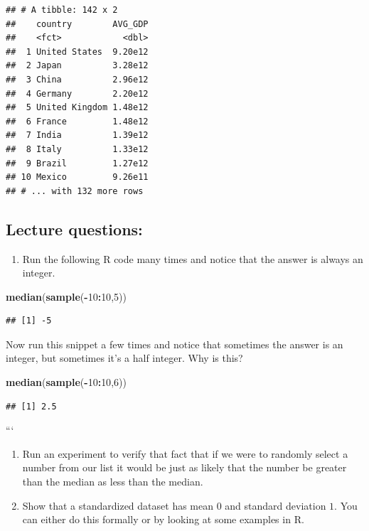 \documentclass[]{book}
\newenvironment{Shaded}{\begin{snugshade}}{\end{snugshade}}
\newcommand{\DecValTok}[1]{\textcolor[rgb]{0.00,0.00,0.81}{#1}}
\newcommand{\KeywordTok}[1]{\textcolor[rgb]{0.13,0.29,0.53}{\textbf{#1}}}
\newcommand{\NormalTok}[1]{#1}
\newcommand{\OperatorTok}[1]{\textcolor[rgb]{0.81,0.36,0.00}{\textbf{#1}}}
\providecommand{\tightlist}{%
  \setlength{\itemsep}{0pt}\setlength{\parskip}{0pt}}
\begin{document}
\begin{verbatim}
## # A tibble: 142 x 2
##    country        AVG_GDP
##    <fct>            <dbl>
##  1 United States  9.20e12
##  2 Japan          3.28e12
##  3 China          2.96e12
##  4 Germany        2.20e12
##  5 United Kingdom 1.48e12
##  6 France         1.48e12
##  7 India          1.39e12
##  8 Italy          1.33e12
##  9 Brazil         1.27e12
## 10 Mexico         9.26e11
## # ... with 132 more rows
\end{verbatim}

\hypertarget{lecture-questions}{%
\subsection{Lecture questions:}\label{lecture-questions}}

\begin{enumerate}
\def\labelenumi{\arabic{enumi}.}
\tightlist
\item
  Run the following R code many times and notice that the answer is always an integer.
\end{enumerate}

\begin{Shaded}
\begin{Highlighting}[]
\KeywordTok{median}\NormalTok{(}\KeywordTok{sample}\NormalTok{(}\OperatorTok{-}\DecValTok{10}\OperatorTok{:}\DecValTok{10}\NormalTok{,}\DecValTok{5}\NormalTok{))}
\end{Highlighting}
\end{Shaded}

\begin{verbatim}
## [1] -5
\end{verbatim}

Now run this snippet a few times and notice that sometimes the answer is an integer, but sometimes it's a half integer. Why is this?

\begin{Shaded}
\begin{Highlighting}[]
\KeywordTok{median}\NormalTok{(}\KeywordTok{sample}\NormalTok{(}\OperatorTok{-}\DecValTok{10}\OperatorTok{:}\DecValTok{10}\NormalTok{,}\DecValTok{6}\NormalTok{))}
\end{Highlighting}
\end{Shaded}

\begin{verbatim}
## [1] 2.5
\end{verbatim}

```

\begin{enumerate}
\def\labelenumi{\arabic{enumi}.}
\setcounter{enumi}{1}
\item
  Run an experiment to verify that fact that if we were to randomly select a number from our list it would be just as likely that the number be greater than the median as less than the median.
\item
  Show that a standardized dataset has mean \(0\) and standard deviation \(1\). You can either do this formally or by looking at some examples in R.
\end{enumerate}
\end{document}
